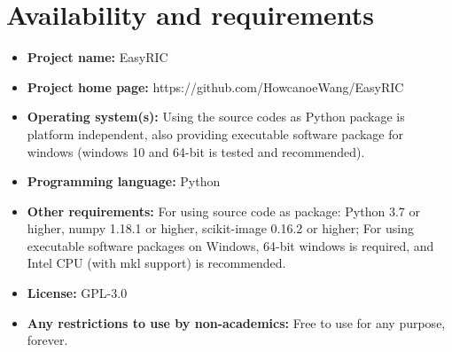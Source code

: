 \documentclass{configs/bmcart}
\begin{document}
\section*{Availability and requirements}
\begin{itemize}
  \item \textbf{Project name:} EasyRIC
  \item \textbf{Project home page:} https://github.com/HowcanoeWang/EasyRIC
  \item \textbf{Operating system(s):} Using the source codes as Python package is platform independent, also providing executable software package for windows (windows 10 and 64-bit is tested and recommended).
  \item \textbf{Programming language: } Python
  \item \textbf{Other requirements:} For using source code as package: Python 3.7 or higher, numpy 1.18.1 or higher, scikit-image 0.16.2 or higher; For using executable software packages on Windows, 64-bit windows is required, and Intel CPU (with mkl support) is recommended.
  \item \textbf{License:} GPL-3.0
  \item \textbf{Any restrictions to use by non-academics:} Free to use for any purpose, forever.
\end{itemize}

\renewcommand*{\glsgroupskip}{}
\printglossary[type=\acronymtype, title=List of abbreviations]


\end{document}
